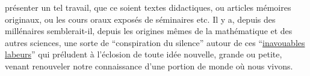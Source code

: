 présenter un tel travail, que ce soient 
 textes didactiques, 
ou  articles 
mémoires\deleted{\unsure{,}}  originaux, ou les  cours oraux
 exposés de séminaires etc.
Il y a, depuis des millénaires semblerait-il, depuis les origines mêmes de
la mathématique et des autres sciences, 
une sorte de ``conspiration du silence'' autour de ces 
``\uline{inavouables} \uline{labeurs}'' qui préludent à l'éclosion de toute idée nouvelle,
grande ou petite, venant renouveler notre connaissance d'une portion de monde où nous vivons.

